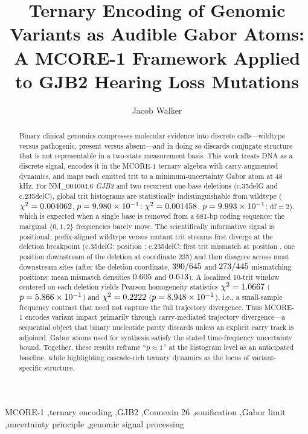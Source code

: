 \documentclass[preprint,12pt]{elsarticle}
\begin{document}
\begin{frontmatter}

\title{Ternary Encoding of Genomic Variants as Audible Gabor Atoms: A MCORE-1 Framework Applied to GJB2 Hearing Loss Mutations}

\author{Jacob Walker}
\address{Symonic LLC, Simpsonville, SC, United States}

\begin{abstract}
Binary clinical genomics compresses molecular evidence into discrete calls---wildtype versus pathogenic, present versus absent---and in doing so discards conjugate structure that is not representable in a two-state measurement basis. This work treats DNA as a discrete signal, encodes it in the MCORE-1 ternary algebra with carry-augmented dynamics, and maps each emitted trit to a minimum-uncertainty Gabor atom at 48\,kHz. For NM\_004004.6 \textit{GJB2} and two recurrent one-base deletions (c.35delG and c.235delC), global trit histograms are statistically indistinguishable from wildtype ($\chi^2=0.004062$, $p=9.980 \times 10^{-1}$; $\chi^2=0.001458$, $p=9.993 \times 10^{-1}$; df$=2$), which is expected when a single base is removed from a 681-bp coding sequence: the marginal $\{0,1,2\}$ frequencies barely move. The scientifically informative signal is positional: prefix-aligned wildtype versus mutant trit streams first diverge at the deletion breakpoint (c.35delG: position \FirstDiffCThirtyFive; c.235delC: first trit mismatch at position \FirstDiffCTwoThirtyFive, one position downstream of the deletion at coordinate 235) and then disagree across most downstream sites (after the deletion coordinate, $390/645$ and $273/445$ mismatching positions; mean mismatch densities $0.605$ and $0.613$). A localized 10-trit window centered on each deletion yields Pearson homogeneity statistics $\chi^2=1.0667$ ($p=5.866 \times 10^{-1}$) and $\chi^2=0.2222$ ($p=8.948 \times 10^{-1}$), i.e., a small-sample frequency contrast that need not capture the full trajectory divergence. Thus MCORE-1 encodes variant impact primarily through carry-mediated trajectory divergence---a sequential object that binary nucleotide parity discards unless an explicit carry track is adjoined. Gabor atoms used for synthesis satisfy the stated time-frequency uncertainty bound. Together, these results reframe ``$p\approx 1$'' at the histogram level as an anticipated baseline, while highlighting cascade-rich ternary dynamics as the locus of variant-specific structure.
\end{abstract}

\begin{keyword}
MCORE-1 \sep ternary encoding \sep GJB2 \sep Connexin 26 \sep sonification \sep Gabor limit \sep uncertainty principle \sep genomic signal processing
\end{keyword}

\end{frontmatter}
\end{document}
